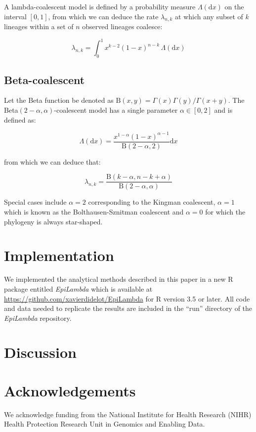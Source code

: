 \documentclass{article}
\begin{document}
A lambda-coalescent model is defined by a probability measure 
$\Lambda(\mathrm{d} x)$ on the interval $[0,1]$, from which we can deduce
the rate $\lambda_{n,k}$ at which any subset of $k$ lineages within a set of $n$ observed lineages 
coalesce:

\begin{equation}
    \lambda_{n,k} = \int_{0}^{1}{x^{k-2}(1-x)^{n-k}\,\Lambda(\mathrm{d} x)}
\end{equation}

\subsection{Beta-coalescent}

Let the Beta function be denoted as $\mathrm{B}(x,y)=\Gamma(x)\Gamma(y)/\Gamma(x+y)$.
The Beta$(2-\alpha,\alpha)$-coalescent model \citep{schweinsbergCoalescentProcessesObtained2003}
has a single parameter $\alpha \in [0,2]$ and is defined as:

\begin{equation}
\Lambda(\mathrm{d}x)=\frac{x^{1-\alpha}(1-x)^{\alpha-1}}{\mathrm{B}(2-\alpha,2)}\mathrm{d}x
\end{equation}

from which we can deduce that:

\begin{equation}
\lambda_{n,k}=\frac{\mathrm{B}(k-\alpha,n-k+\alpha)}{\mathrm{B}(2-\alpha,\alpha)}
\end{equation}

Special cases include $\alpha=2$ corresponding to the Kingman coalescent,
$\alpha=1$ which is known as the Bolthausen-Sznitman coalescent
and $\alpha=0$ for which the phylogeny is always star-shaped.

\section{Implementation}

We implemented the analytical methods described in this paper in a 
new R package entitled \emph{EpiLambda} which is available
at \url{https://github.com/xavierdidelot/EpiLambda} for R version 3.5 or later. 
All code and data needed to replicate the results are included in the ``run'' directory of the \emph{EpiLambda} repository.

\section{Discussion}

\section*{Acknowledgements}

We acknowledge funding from the National Institute for Health Research (NIHR) Health Protection Research Unit in Genomics and Enabling Data.

\newpage


\end{document}
